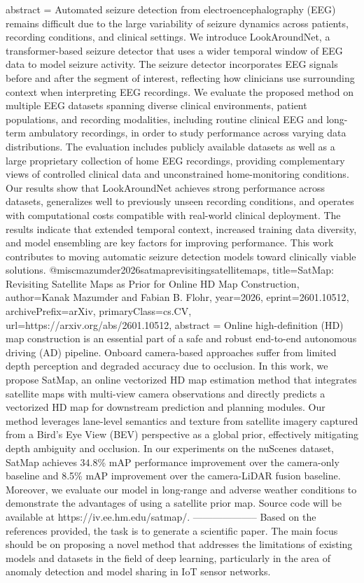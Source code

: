 {      abstract = {Automated seizure detection from electroencephalography (EEG) remains difficult due to the large variability of seizure dynamics across patients, recording conditions, and clinical settings. We introduce LookAroundNet, a transformer-based seizure detector that uses a wider temporal window of EEG data to model seizure activity. The seizure detector incorporates EEG signals before and after the segment of interest, reflecting how clinicians use surrounding context when interpreting EEG recordings. We evaluate the proposed method on multiple EEG datasets spanning diverse clinical environments, patient populations, and recording modalities, including routine clinical EEG and long-term ambulatory recordings, in order to study performance across varying data distributions. The evaluation includes publicly available datasets as well as a large proprietary collection of home EEG recordings, providing complementary views of controlled clinical data and unconstrained home-monitoring conditions. Our results show that LookAroundNet achieves strong performance across datasets, generalizes well to previously unseen recording conditions, and operates with computational costs compatible with real-world clinical deployment. The results indicate that extended temporal context, increased training data diversity, and model ensembling are key factors for improving performance. This work contributes to moving automatic seizure detection models toward clinically viable solutions.}
}@misc{mazumder2026satmaprevisitingsatellitemaps,
      title={SatMap: Revisiting Satellite Maps as Prior for Online HD Map Construction}, 
      author={Kanak Mazumder and Fabian B. Flohr},
      year={2026},
      eprint={2601.10512},
      archivePrefix={arXiv},
      primaryClass={cs.CV},
      url={https://arxiv.org/abs/2601.10512},
      abstract = {Online high-definition (HD) map construction is an essential part of a safe and robust end-to-end autonomous driving (AD) pipeline. Onboard camera-based approaches suffer from limited depth perception and degraded accuracy due to occlusion. In this work, we propose SatMap, an online vectorized HD map estimation method that integrates satellite maps with multi-view camera observations and directly predicts a vectorized HD map for downstream prediction and planning modules. Our method leverages lane-level semantics and texture from satellite imagery captured from a Bird's Eye View (BEV) perspective as a global prior, effectively mitigating depth ambiguity and occlusion. In our experiments on the nuScenes dataset, SatMap achieves 34.8\% mAP performance improvement over the camera-only baseline and 8.5\% mAP improvement over the camera-LiDAR fusion baseline. Moreover, we evaluate our model in long-range and adverse weather conditions to demonstrate the advantages of using a satellite prior map. Source code will be available at https://iv.ee.hm.edu/satmap/.}
}
        --------------------
         Based on the references provided, the task is to generate a scientific paper. The main focus should be on proposing a novel method that addresses the limitations of existing models and datasets in the field of deep learning, particularly in the area of anomaly detection and model sharing in IoT sensor networks. 

